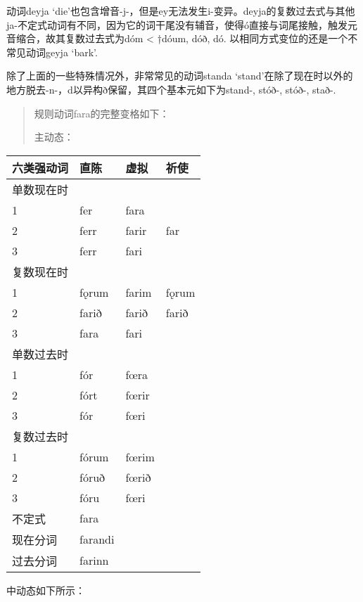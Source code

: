 动词deyja
`die'也包含增音-j-，但是ey无法发生i-变异。deyja的复数过去式与其他ja-不定式动词有不同，因为它的词干尾没有辅音，使得ó直接与词尾接触，触发元音缩合，故其复数过去式为dóm
\textless{} †dóum, dóð, dó. 以相同方式变位的还是一个不常见动词geyja
`bark'.

除了上面的一些特殊情况外，非常常见的动词standa
`stand‌'在除了现在时以外的地方脱去-n-，d以异构ð保留，其四个基本元如下为stand-,
stóð-, stóð-, stað-.

\begin{quote}
  规则动词fara的完整变格如下：

  主动态：
\end{quote}

\begin{longtable}{llll}
  \toprule
  六类强动词 & 直陈      & 虚拟    & 祈使    \\
  \midrule
  \endhead
  \bottomrule
  \endfoot
  单数现在时 &         &       &       \\
  1     & fer     & fara  &       \\
  2     & ferr    & farir & far   \\
  3     & ferr    & fari  &       \\
  复数现在时 &         &       &       \\
  1     & fǫrum   & farim & fǫrum \\
  2     & farið   & farið & farið \\
  3     & fara    & fari  &       \\
  单数过去时 &         &       &       \\
  1     & fór     & fœra  &       \\
  2     & fórt    & fœrir &       \\
  3     & fór     & fœri  &       \\
  复数过去时 &         &       &       \\
  1     & fórum   & fœrim &       \\
  2     & fóruð   & fœrið &       \\
  3     & fóru    & fœri  &       \\
  不定式   & fara    &       &       \\
  现在分词  & farandi &       &       \\
  过去分词  & farinn  &       &       \\
\end{longtable}

中动态如下所示：


